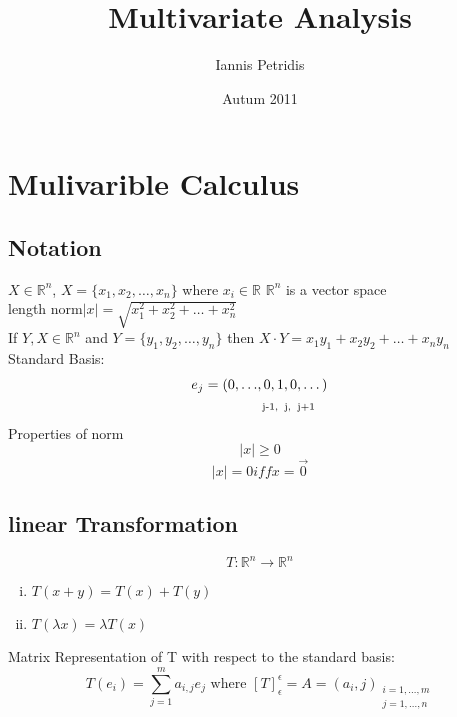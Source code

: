 \documentclass[12pt]{article}
\def\RR{\mathbb{R}}
\begin{document}
\title{Multivariate Analysis}
\author{Iannis Petridis}
\date{Autum 2011}
\maketitle

\tableofcontents
\setcounter{tocdepth}{4}
\newpage

\section{Mulivarible  Calculus}
\subsection{Notation}
$X\in\RR^{n}$, $ X=\{x_{1},x_{2},\dots,x_{n}\}$ where $x_{i}\in\RR$
$\RR^{n}$ is a vector space\\
length norm$|x|=\sqrt{x_1^2 + x_2^2 + \dots +x_n^2 }$\\
If $Y,X\in\RR^{n}$ and $ Y=\{y_{1},y_{2},\dots,y_{n}\}$ then $X \cdot Y=x_{1}y_{1}+ x_{2}y_{2} +\dots + x_{n}y_{n}$\\
Standard Basis:
\begin{align*}
  e_j=(0, \dots &,  0, 1, 0, \dots)\\
& \textrm{ \scriptsize j-1,\: j, \:j+1} 
\end{align*}
Properties of norm
\[|x|\geq0\]
\[|x|=0 iff x=\vec{0}\]


\subsection{linear Transformation}
\[T:\RR^{n}\rightarrow\RR^{n}\]
\begin{enumerate}[(i)]
\item $T(x+y)=T(x) + T(y)$
\item $ T(\lambda x) =\lambda T(x) $
\end{enumerate}
Matrix Representation of T with respect to the standard basis:\\
\[T(e_i)=\sum_{j=1}^{m}a_{i,j}e_j \textrm{ where } [T]_{\epsilon}^{\epsilon}=A=(a_i,j)_{\substack{i=1,\dots ,m \\ j=1,\dots ,n}}\]
\end{document}
